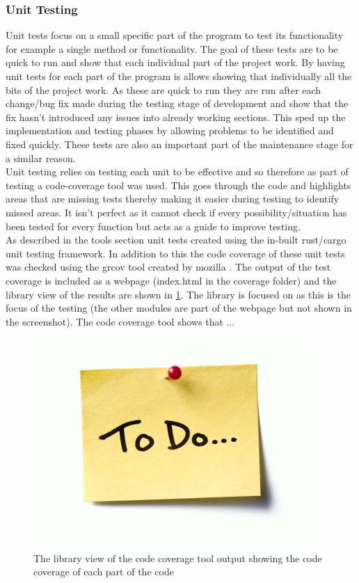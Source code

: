 \documentclass[11pt,a4paper]{article}
\begin{document}
\subsubsection{Unit Testing}
Unit tests focus on a small specific part of the program to test its functionality for example a single method or functionality. The goal of these tests are to be quick to run and show that each individual part of the project work. By having unit tests for each part of the program is allows showing that individually all the bits of the project work. As these are quick to run they are run after each change/bug fix made during the testing stage of development and show that the fix hasn't introduced any issues into already working sections. This sped up the implementation and testing phases by allowing problems to be identified and fixed quickly. These tests are also an important part of the maintenance stage for a similar reason.\\

Unit testing relies on testing each unit to be effective and so therefore as part of testing a code-coverage tool was used. This goes through the code and highlights areas that are missing tests thereby making it easier during testing to identify missed areas. It isn't perfect as it cannot check if every possibility/situation has been tested for every function but acts as a guide to improve testing.\\

As described in the tools section unit tests created using the in-built rust/cargo unit testing framework. In addition to this the code coverage of these unit tests was checked using the grcov tool created by mozilla \cite{GRCOV}. The output of the test coverage is included as a webpage (index.html in the coverage folder) and the library view of the results are shown in \ref{GRCOV_TOP_LEVEL}. The library is focused on as this is the focus of the testing (the other modules are part of the webpage but not shown in the screenshot). The code coverage tool shows that ... 

\begin{figure}[H]
	\label{GRCOV_TOP_LEVEL}
	\includegraphics[width=\textwidth]{todo.jpg}
	\caption{The library view of the code coverage tool output showing the code coverage of each part of the code}
\end{figure}
\end{document}

